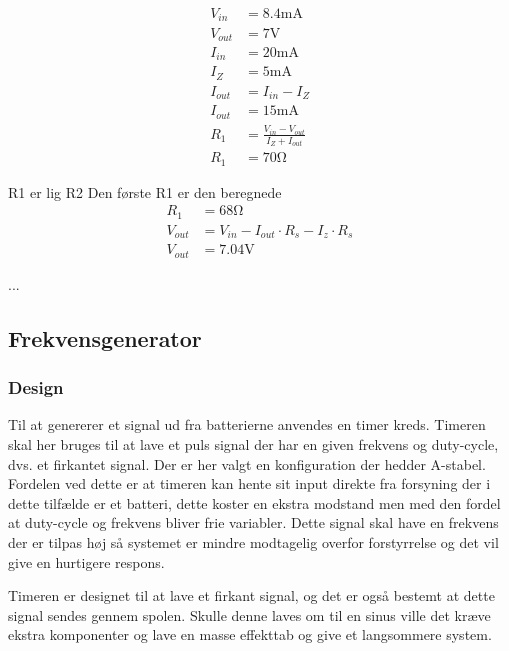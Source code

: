 	
	\begin{align}
	V_{in} & = 8.4 \si{\milli\ampere} \nonumber \\
	V_{out} & = 7 \si{\volt} \nonumber \\
	I_{in} & = 20\si{\milli\ampere} \nonumber \\
	I_Z & = 5 \si{\milli\ampere} \nonumber \\
	I_{out} & = I_{in} - I_Z \\
	I_{out} & = 15 \si{\milli\ampere} \nonumber \\
	R_1 & = \frac{V_{in} - V_{out}}{I_Z + I_{out}} \label{eq:RegulatorModstand} \\
	R_1 & = 70 \si{\ohm} \nonumber \label{eq:RegulatorModstandBeregnet}
	\end{align}
	
	R1 er lig R2
	Den første R1 er den beregnede
	\begin{align}
	R_1 & = 68 \si{\ohm} \nonumber \\
	V_{out} & = V_{in} - I_{out} \cdot R_s - I_z \cdot R_s \\
	V_{out} & = 7.04 \si{\volt} \label{eq:RegulatorBeregnetPotentiale} 
	\end{align}
	



...

\subsection{Frekvensgenerator}
\subsubsection{Design}
Til at genererer et signal ud fra batterierne anvendes en timer kreds. 
Timeren skal her bruges til at lave et puls signal der har en given frekvens og duty-cycle, dvs. et firkantet signal. 
Der er her valgt en konfiguration der hedder A-stabel. 
Fordelen ved dette er at timeren kan hente sit input direkte fra forsyning der i dette tilfælde er et batteri, dette koster en ekstra modstand men med den fordel at duty-cycle og frekvens bliver frie variabler. 
Dette signal skal have en frekvens der er tilpas høj så systemet er mindre modtagelig overfor forstyrrelse og det vil give en hurtigere respons. \\

Timeren er designet til at lave et firkant signal, og det er også bestemt at dette signal sendes gennem spolen.
Skulle denne laves om til en sinus ville det kræve ekstra komponenter og lave en masse effekttab og give et langsommere system.

